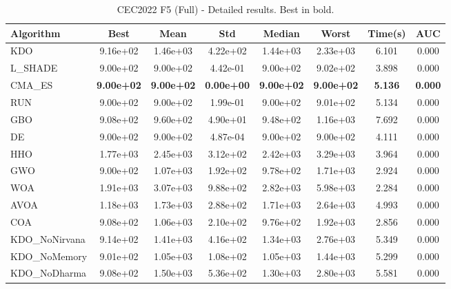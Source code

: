 \begin{table}[H]
\centering\small
\caption{CEC2022 F5 (Full) - Detailed results. Best in bold.}
\label{tab:cec2022_F5}
\begin{tabular}{lccccccc}
\toprule
\textbf{Algorithm} & \textbf{Best} & \textbf{Mean} & \textbf{Std} & \textbf{Median} & \textbf{Worst} & \textbf{Time(s)} & \textbf{AUC} \\
\midrule
KDO & 9.16e+02 & 1.46e+03 & 4.22e+02 & 1.44e+03 & 2.33e+03 & 6.101 & 0.000 \\
L_SHADE & 9.00e+02 & 9.00e+02 & 4.42e-01 & 9.00e+02 & 9.02e+02 & 3.898 & 0.000 \\
CMA_ES & \textbf{9.00e+02} & \textbf{9.00e+02} & \textbf{0.00e+00} & \textbf{9.00e+02} & \textbf{9.00e+02} & \textbf{5.136} & \textbf{0.000} \\
RUN & 9.00e+02 & 9.00e+02 & 1.99e-01 & 9.00e+02 & 9.01e+02 & 5.134 & 0.000 \\
GBO & 9.08e+02 & 9.60e+02 & 4.90e+01 & 9.48e+02 & 1.16e+03 & 7.692 & 0.000 \\
DE & 9.00e+02 & 9.00e+02 & 4.87e-04 & 9.00e+02 & 9.00e+02 & 4.111 & 0.000 \\
HHO & 1.77e+03 & 2.45e+03 & 3.12e+02 & 2.42e+03 & 3.29e+03 & 3.964 & 0.000 \\
GWO & 9.00e+02 & 1.07e+03 & 1.92e+02 & 9.78e+02 & 1.71e+03 & 2.924 & 0.000 \\
WOA & 1.91e+03 & 3.07e+03 & 9.88e+02 & 2.82e+03 & 5.98e+03 & 2.284 & 0.000 \\
AVOA & 1.18e+03 & 1.73e+03 & 2.88e+02 & 1.71e+03 & 2.64e+03 & 4.993 & 0.000 \\
COA & 9.08e+02 & 1.06e+03 & 2.10e+02 & 9.76e+02 & 1.92e+03 & 2.856 & 0.000 \\
KDO_NoNirvana & 9.14e+02 & 1.41e+03 & 4.16e+02 & 1.34e+03 & 2.76e+03 & 5.349 & 0.000 \\
KDO_NoMemory & 9.01e+02 & 1.05e+03 & 1.08e+02 & 1.05e+03 & 1.44e+03 & 5.299 & 0.000 \\
KDO_NoDharma & 9.08e+02 & 1.50e+03 & 5.36e+02 & 1.30e+03 & 2.80e+03 & 5.581 & 0.000 \\
\bottomrule
\end{tabular}
\end{table}
